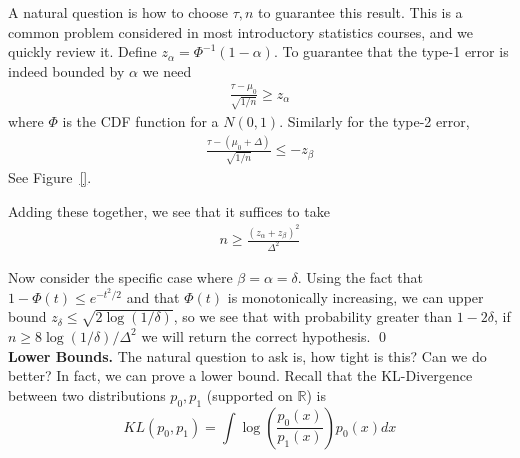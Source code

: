 \documentclass[11pt]{article}
\newcommand{\1}[1]{\mathbf{1}\left\{#1\right\}}
\begin{document}
A natural question is how to choose $\tau, n$ to guarantee this result. This is a common problem considered in most introductory statistics courses, and we quickly review it. Define $z_{\alpha} = \Phi^{-1}(1-\alpha)$. To guarantee that the type-1 error is indeed bounded by $\alpha$ we need
\begin{align*}
    \frac{\tau - \mu_0}{\sqrt{1/n}} \geq z_{\alpha} 
\end{align*}
where $\Phi$ is the CDF function for a $N(0,1)$. Similarly for the type-2 error,
\begin{align*}
    \frac{\tau - (\mu_0+\Delta) }{\sqrt{1/n}} \leq -z_{\beta} 
\end{align*}
See Figure~\ref{}.

Adding these together, we see that it suffices to take
\begin{align*}
    n \geq \frac{(z_{\alpha} + z_{\beta})^2}{\Delta^2}
\end{align*}

Now consider the specific case where $\beta = \alpha = \delta$. Using the fact that $1-\Phi(t) \leq e^{-t^2/2}$ and that $\Phi(t)$ is monotonically increasing, we can upper bound $z_{\delta}\leq \sqrt{2\log(1/\delta)}$, so we see that with probability greater than $1-2\delta$, if $n\geq 8\log(1/\delta)/\Delta^2$ we will return the correct hypothesis. \qed\\


\noindent\textbf{Lower Bounds. } The natural question to ask is, how tight is this? Can we do better? In fact, we can prove a lower bound. Recall that the KL-Divergence between two distributions $p_0, p_1$ (supported on $\mathbb{R}$) is 
\begin{equation*}
    KL(p_0, p_1) = \int \log\left(\frac{p_0(x)}{p_1(x)}\right) p_0(x) dx
\end{equation*}
\end{document}
